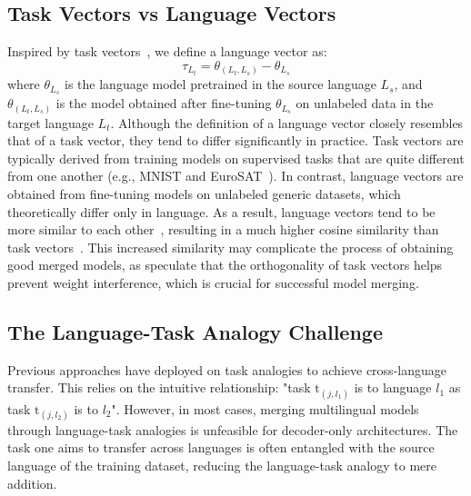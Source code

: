 \subsection{Task Vectors vs Language Vectors}
Inspired by task vectors~\citep{task-vectors, crossmerge}, we define a language vector as:
%
\begin{equation}
    \tau_{L_t} = \theta_{(L_t,L_s)} - \theta_{L_s}
\end{equation}
%
where $\theta_{L_s}$ is the language model pretrained in the source language $L_s$, and $\theta_{(L_t,L_s)}$ is the model obtained after fine-tuning $\theta_{L_s}$ on unlabeled data in the target language $L_t$. Although the definition of a language vector closely resembles that of a task vector, they tend to differ significantly in practice. Task vectors are typically derived from training models on supervised tasks that are quite different from one another (e.g., MNIST and EuroSAT~\citep{task-vectors}). In contrast, language vectors are obtained from fine-tuning models on unlabeled generic datasets, which theoretically differ only in language. As a result, language vectors tend to be more similar to each other~\cite{notrain}, resulting in a much higher cosine similarity than task vectors~\citep{notrain}. This increased similarity may complicate the process of obtaining good merged models, as \citet{task-vectors} speculate that the orthogonality of task vectors helps prevent weight interference, which is crucial for successful model merging.


\subsection{The Language-Task Analogy Challenge}


Previous approaches \cite{crossmerge} have deployed on task analogies \cite{task-vectors} to achieve cross-language transfer. This relies on the intuitive relationship: "task $\text{t}_{(j,l_1)}$ is to language $l_1$ as task $\text{t}_{(j,l_2)}$ is to $l_2$". However, in most cases, merging multilingual models through language-task analogies is unfeasible for decoder-only architectures. The task one aims to transfer across languages is often entangled with the source language of the training dataset, reducing the language-task analogy to mere addition.

